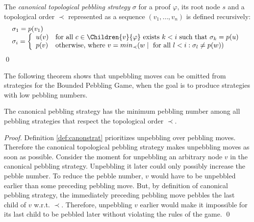 \begin{definition}
\label{def:canonstrat}
The \emph{canonical topological pebbling strategy} $\sigma$ for a proof $\varphi$, its root node $s$ and a topological order $\prec$ represented as a sequence $(v_1,\dots,v_n)$ is defined recursively:
$$
\begin{array}{l}
\sigma_1 = p(v_1) \\
\sigma_i = 
	\left\{
	\begin{array}{ll}
		u(v) & \text{for all } c \in \Children{v}{\varphi} \text{ exists } k < i \text { such that } \sigma_k = p(u)\\
		p(v) & \text{otherwise, where } v = min_{\prec}(w \mid \text{ for all } l < i: \sigma_l \neq p(w))
	\end{array}
	\right.
\end{array}
$$
\qed
\end{definition}

The following theorem shows that unpebbling moves can be omitted from strategies for the Bounded Pebbling Game, when the goal is to produce strategies with low pebbling numbers.

\begin{theorem}
\label{theorem:canonical}
The canonical pebbling strategy has the minimum pebbling number among all pebbling strategies that respect the topological order $\prec$.
\end{theorem}
\begin{proof}
Definition \ref{def:canonstrat} prioritizes unpebbling over pebbling moves.
Therefore the canonical topological pebbling strategy makes unpebbling moves as soon as possible.
Consider the moment for unpebbling an arbitrary node $v$ in the canonical pebbling strategy. 
Unpebbling it later could only possibly increase the pebble number. 
To reduce the pebble number, $v$ would have to be unpebbled earlier than some preceding pebbling move. 
But, by definition of canonical pebbling strategy, the immediately preceding pebbling move pebbles the last child of $v$ w.r.t. $\prec$. 
Therefore, unpebbling $v$ earlier would make it impossible for its last child to be pebbled later without violating the rules of the game.
\qed
\end{proof}

